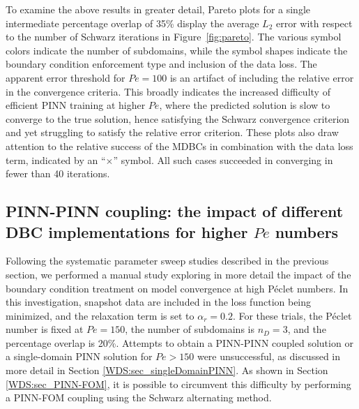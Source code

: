 \documentclass[oneside,final]{csri23}
\begin{document}
To examine the above results in greater detail, Pareto plots for a single intermediate percentage overlap of 35\% display the average $L_2$ error with respect to the number of Schwarz iterations in Figure~\ref{fig:pareto}. The various symbol colors indicate the number of subdomains, while the symbol shapes indicate the boundary condition enforcement type and inclusion of the data loss. The apparent error threshold for $Pe = 100$ is an artifact of including the relative error in the convergence criteria. This broadly indicates the increased difficulty of efficient PINN training at higher $Pe$, where the predicted solution is slow to converge to the true solution, hence satisfying the Schwarz convergence criterion and yet struggling to satisfy the relative error criterion. These plots also draw attention to the relative success of the MDBCs in combination with the data loss term, indicated by an ``$\times$'' symbol. All such cases succeeded in converging in fewer than 40 iterations. 

\subsection{PINN-PINN coupling: the impact of different DBC implementations for higher $Pe$ numbers} \label{WDS:sec_higherPe}

Following the systematic parameter sweep studies described in the previous section, we performed a manual study exploring in more detail the impact of the boundary condition treatment on model convergence at high P\'{e}clet numbers. In this investigation, snapshot data are included in the loss function being minimized, and the relaxation term is set to $\alpha_r=0.2$. For these trials, the P\'{e}clet number is fixed at $Pe=150$, the number of subdomains is $n_D = 3$, and the percentage overlap is 20\%. Attempts to obtain a PINN-PINN coupled solution or a single-domain PINN solution for $Pe > 150$ were unsuccessful, as discussed in more detail in Section \ref{WDS:sec_singleDomainPINN}. As shown in Section \ref{WDS:sec_PINN-FOM}, it is possible to circumvent this difficulty by performing a PINN-FOM coupling using the Schwarz alternating method.  
\end{document}
